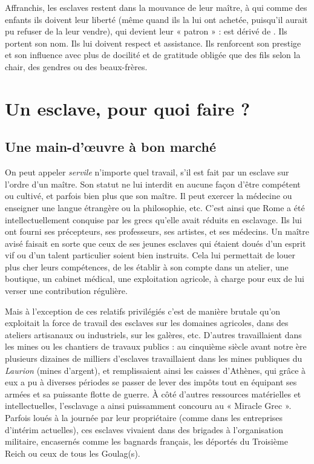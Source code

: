 Affranchis, les esclaves restent dans la mouvance de
leur maître, à qui comme des enfants ils doivent leur liberté (même
quand ils la lui ont achetée, puisqu'il aurait pu refuser de la leur vendre),
qui devient leur « patron » :  est dérivé de . Ils portent son
nom. Ils lui doivent respect et assistance. Ils renforcent son prestige et
son influence avec plus de docilité et de gratitude obligée que des fils selon
la chair, des gendres ou des beaux-frères.


\section{Un esclave, pour quoi faire ?}

\subsection{Une main-d'œuvre à bon marché}

On peut appeler \emph{servile} n'importe quel travail, s'il est fait par un esclave
sur l'ordre d'un maître. Son statut ne lui interdit en aucune façon
d'être compétent ou cultivé, et parfois bien plus que son maître. Il peut
exercer la médecine ou enseigner une langue étrangère ou la philosophie,
etc. C'est ainsi que Rome a été intellectuellement conquise par les grecs
qu'elle avait réduits en esclavage. Ils lui ont fourni ses précepteurs, ses
professeurs, ses artistes, et ses médecins. Un maître avisé faisait en sorte
que ceux de ses jeunes esclaves qui étaient doués d'un esprit vif ou d'un
talent particulier soient bien instruits. Cela lui permettait de louer plus
cher leurs compétences, de les établir à son compte dans un atelier, une
boutique, un cabinet médical, une exploitation agricole, à charge pour
eux de lui verser une contribution régulière.

Mais à l'exception de ces relatifs privilégiés c'est de manière brutale
qu'on exploitait la force de travail des esclaves sur les domaines agricoles,
dans des ateliers artisanaux ou industriels, sur les galères, etc. D'autres
travaillaient dans les mines ou les chantiers de travaux publics : au
cinquième siècle avant notre ère plusieurs dizaines de milliers d'esclaves
travaillaient dans les mines publiques du \emph{Laurion} (mines d'argent), et
remplissaient ainsi les caisses d'Athènes, qui grâce à eux a pu à diverses
périodes se passer de lever des impôts tout en équipant ses armées et sa
puissante flotte de guerre. À côté d'autres ressources matérielles et intellectuelles,
l'esclavage a ainsi puissamment concouru au « Miracle Grec ».
Parfois loués à la journée par leur propriétaire (comme dans les entreprises
d'intérim actuelles), ces esclaves vivaient dans des brigades à l'organisation
militaire, encasernés comme les bagnards français, les déportés du
Troisième Reich ou ceux de tous les Goulag(s).


